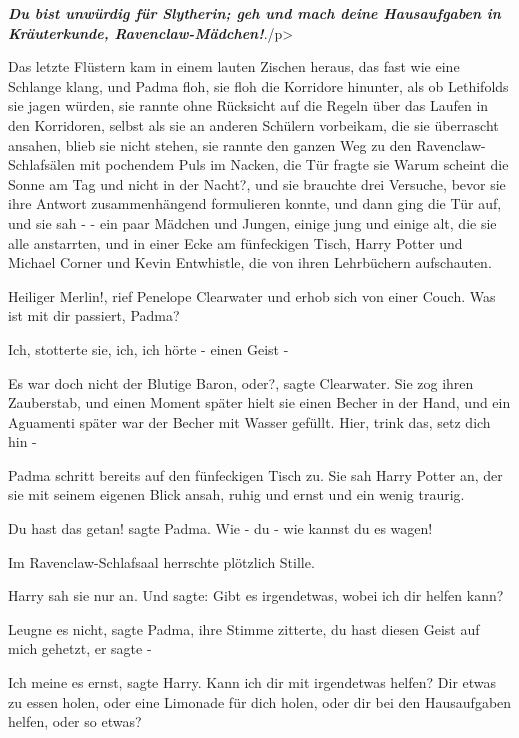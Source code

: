 \textbf{\emph{Du bist unwürdig für
Slytherin; geh und mach deine Hausaufgaben in Kräuterkunde,
Ravenclaw-Mädchen!}}\grqq{}./p>

Das letzte Flüstern kam in einem lauten Zischen heraus, das fast wie eine
Schlange klang, und Padma floh, sie floh die Korridore hinunter, als ob
Lethifolds sie jagen würden, sie rannte ohne Rücksicht auf die Regeln über das
Laufen in den Korridoren, selbst als sie an anderen Schülern vorbeikam, die sie
überrascht ansahen, blieb sie nicht stehen, sie rannte den ganzen Weg zu den
Ravenclaw-Schlafsälen mit pochendem Puls im Nacken, die Tür fragte sie \glqq{}
Warum scheint die Sonne am Tag und nicht in der Nacht?\grqq{}, und sie brauchte
drei Versuche, bevor sie ihre Antwort zusammenhängend formulieren konnte, und
dann ging die Tür auf, und sie sah - - ein paar Mädchen und Jungen, einige jung
und einige alt, die sie alle anstarrten, und in einer Ecke am fünfeckigen Tisch,
Harry Potter und Michael Corner und Kevin Entwhistle, die von ihren Lehrbüchern
aufschauten.

\glqq{}Heiliger Merlin!\grqq{}, rief Penelope Clearwater und erhob sich von einer
Couch. \glqq{}Was ist mit dir passiert, Padma?\grqq{}

\glqq{}Ich\grqq{}, stotterte sie, \glqq{}ich, ich hörte - einen Geist -\grqq{}

\glqq{}Es war doch nicht der Blutige Baron, oder?\grqq{}, sagte Clearwater. Sie
zog ihren Zauberstab, und einen Moment später hielt sie einen Becher in der
Hand, und ein Aguamenti später war der Becher mit Wasser gefüllt. \glqq{}Hier,
trink das, setz dich hin -\grqq{}

Padma schritt bereits auf den fünfeckigen Tisch zu. Sie sah Harry Potter an, der
sie mit seinem eigenen Blick ansah, ruhig und ernst und ein wenig traurig.

\glqq{}Du hast das getan!\grqq{} sagte Padma. \glqq{}Wie - du - wie kannst du es
wagen!\grqq{}

Im Ravenclaw-Schlafsaal herrschte plötzlich Stille.

Harry sah sie nur an. Und sagte: \glqq{}Gibt es irgendetwas, wobei ich dir helfen
kann?\grqq{}

\glqq{}Leugne es nicht\grqq{}, sagte Padma, ihre Stimme zitterte, \glqq{}du hast
diesen Geist auf mich gehetzt, er sagte -\grqq{}

\glqq{}Ich meine es ernst\grqq{}, sagte Harry. \glqq{}Kann ich dir mit irgendetwas
helfen? Dir etwas zu essen holen, oder eine Limonade für dich holen, oder dir
bei den Hausaufgaben helfen, oder so etwas?\grqq{}

